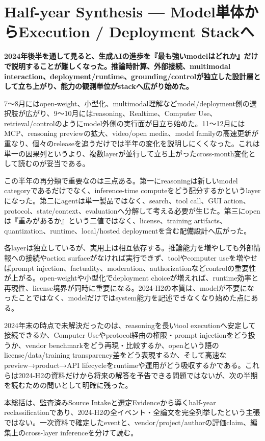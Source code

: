 \section{Half-year Synthesis — Model単体からExecution / Deployment Stackへ}
\label{pkg:synthesis}
\noindent\textbf{2024年後半を通して見ると、生成AIの進歩を『最も強いmodelはどれか』だけで説明することが難しくなった。推論時計算、外部接続、multimodal interaction、deployment/runtime、grounding/controlが独立した設計層として立ち上がり、能力の観測単位がstackへ広がり始めた。}\autocite{src-9cf289b414fd,src-bcbc025369e3}

7〜8月にはopen-weight、小型化、multimodal理解などmodel/deployment側の選択肢が広がり、9〜10月にはreasoning、Realtime、Computer Use、retrieval/controlのようにmodel外側の実行面が目立ち始めた。11〜12月にはMCP、reasoning previewの拡大、video/open media、model familyの高速更新が重なり、個々のreleaseを追うだけでは半年の変化を説明しにくくなった。これは単一の因果列というより、複数layerが並行して立ち上がったcross-month変化として読むのが妥当である。\autocite{src-bcbc025369e3,src-ee43656ed6da}


この半年の再分類で重要なのは三点ある。第一にreasoningは新しいmodel categoryであるだけでなく、inference-time computeをどう配分するかというlayerになった。第二にagentは単一製品ではなく、search、tool call、GUI action、protocol、state/context、evaluationへ分解して考える必要が生じた。第三にopenは『重みがあるか』という二値ではなく、license、training artifacts、quantization、runtime、local/hosted deploymentを含む配備設計へ広がった。\autocite{src-9cf289b414fd,src-ee43656ed6da}


各layerは独立しているが、実用上は相互依存する。推論能力を増やしても外部情報への接続やaction surfaceがなければ実行できず、toolやcomputer useを増やせばprompt injection、factuality、moderation、authorizationなどcontrolの重要性が上がる。open-weightや小型化でdeployment choiceが増えれば、runtime効率と再現性、license境界が同時に重要になる。2024-H2の本質は、modelが不要になったことではなく、modelだけではsystem能力を記述できなくなり始めた点にある。\autocite{src-3278a129a17e,src-9cf289b414fd}


2024年末の時点で未解決だったのは、reasoningを長いtool executionへ安定して接続できるか、Computer Useやprotocol経由の権限・prompt injectionをどう扱うか、vendor benchmarkをどう再現・比較するか、openという語のlicense/data/training transparency差をどう表現するか、そして高速なpreview→product→API lifecycleをruntimeや運用がどう吸収するかである。これらは2024-H2の資料だけから将来の解答を予告できる問題ではないが、次の半期を読むための問いとして明確に残った。\autocite{src-3278a129a17e,src-bcbc025369e3}


\begin{claimboundary}
本総括は、監査済みSource Intakeと選定Evidenceから導くhalf-year reclassificationであり、2024-H2の全イベント・全論文を完全列挙したという主張ではない。一次資料で確定したeventと、vendor/project/authorの評価claim、編集上のcross-layer inferenceを分けて読む。\autocite{src-bcbc025369e3}
\end{claimboundary}
